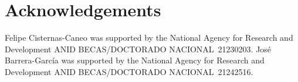 \documentclass[runningheads]{llncs}
\begin{document}
\vspace{-0.25cm}

\section*{Acknowledgements}
\vspace{-0.25cm}
Felipe Cisternas-Caneo was supported by the National Agency for Research and Development ANID BECAS/DOCTORADO NACIONAL 21230203.
José Barrera-García was supported by the National Agency for Research and Development ANID BECAS/DOCTORADO NACIONAL 21242516.

\vspace{-0.25cm}
%
%
%


\end{document}
